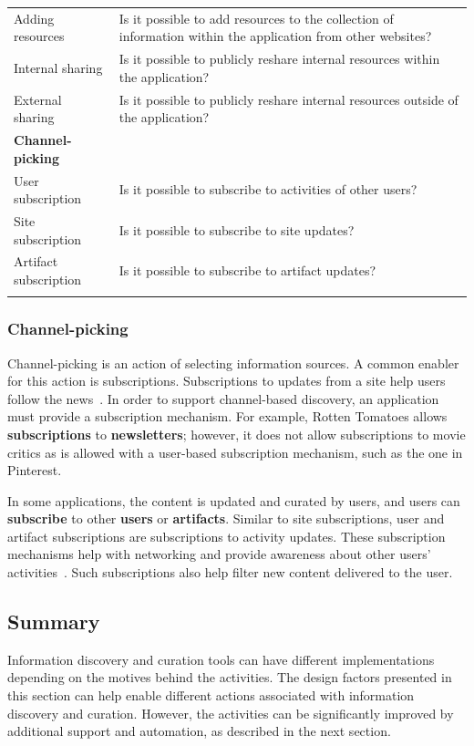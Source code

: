\documentclass{sigchi}
\begin{document}
{{{\begin{table}[ht!]
\begin{tabular}{|p{}|  p{}|}
Adding resources        & Is it possible to add resources to the collection of information within the application from other websites? \\
Internal sharing        & Is it possible to publicly reshare internal resources within the application? \\ 
External sharing        & Is it possible to publicly reshare internal resources outside of the application? \\ 
\textbf{Channel-picking}  	& \\
User subscription       & Is it possible to subscribe to activities of other users? \\
Site subscription       & Is it possible to subscribe to site updates? \\
Artifact subscription  	& Is it possible to subscribe to artifact updates?\\
& \\
\hline        
\end{tabular}
\end{table}

{\subsubsection{Channel-picking}

Channel-picking is an action of selecting information sources. A common enabler for this action is subscriptions. Subscriptions to updates from a site help users follow the news~\cite{java2007feeds}. In order to support channel-based discovery, an application must provide a subscription mechanism. For example, Rotten Tomatoes allows \textbf{subscriptions} to \textbf{newsletters}; however, it does not allow subscriptions to movie critics as is allowed with a user-based subscription mechanism, such as the one in Pinterest. 

In some applications, the content is updated and curated by users, and users can \textbf{subscribe} to other \textbf{users} or \textbf{artifacts}. Similar to site subscriptions, user and artifact subscriptions are subscriptions to activity updates. These subscription mechanisms help with networking and provide awareness about other users' activities~\cite{millen2005social}. Such subscriptions also help filter new content delivered to the user. 
} %
} %

{\subsection{Summary}
Information discovery and curation tools can have different implementations depending on the motives behind the activities. The design factors presented in this section can help enable different actions associated with information discovery and curation. However, the activities can be significantly improved by additional support and automation, as described in the next section.
}
} %

}
\end{document}

